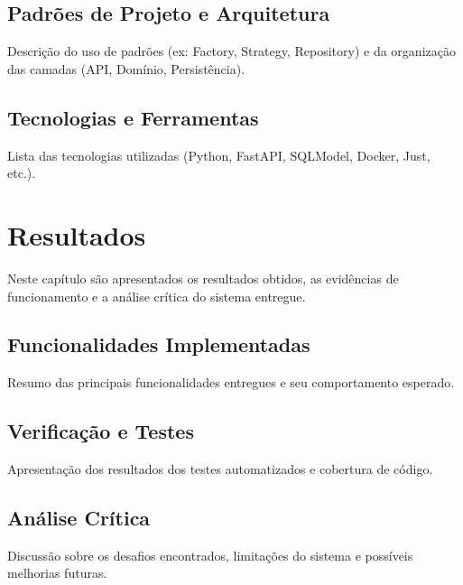 \subsection{Padrões de Projeto e Arquitetura}
\label{subsec:padroes}
Descrição do uso de padrões (ex: Factory, Strategy, Repository) e da organização das camadas (API, Domínio, Persistência).

\subsection{Tecnologias e Ferramentas}
\label{subsec:tecnologias}
Lista das tecnologias utilizadas (Python, FastAPI, SQLModel, Docker, Just, etc.).

\section{Resultados}
\label{sec:resultados}
Neste capítulo são apresentados os resultados obtidos, as evidências de funcionamento e a análise crítica do sistema entregue.

\subsection{Funcionalidades Implementadas}
\label{subsec:funcionalidades}
Resumo das principais funcionalidades entregues e seu comportamento esperado.

\subsection{Verificação e Testes}
\label{subsec:testes}
Apresentação dos resultados dos testes automatizados e cobertura de código.

\subsection{Análise Crítica}
\label{subsec:analise}
Discussão sobre os desafios encontrados, limitações do sistema e possíveis melhorias futuras.
